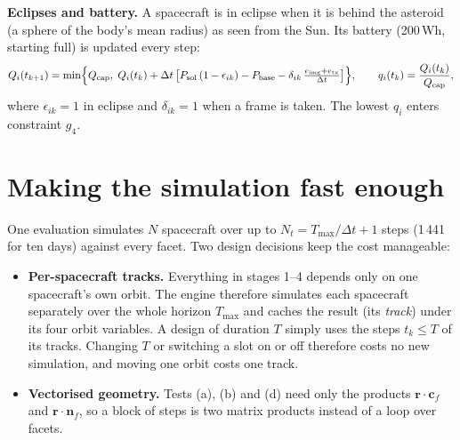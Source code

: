 \textbf{Eclipses and battery.} A spacecraft is in eclipse when it is behind the asteroid (a sphere
of the body's mean radius) as seen from the Sun. Its battery (200\,Wh, starting full) is updated
every step:
\begin{equation}
Q_i(t_{k+1})=\min\Bigl\{Q_{\mathrm{cap}},\;Q_i(t_k)+\Delta t\,\bigl[P_{\mathrm{sol}}\,(1-\epsilon_{ik})-P_{\mathrm{base}}
-\delta_{ik}\,\tfrac{e_{\mathrm{img}}+e_{\mathrm{tx}}}{\Delta t}\bigr]\Bigr\},\qquad q_i(t_k)=\frac{Q_i(t_k)}{Q_{\mathrm{cap}}},
\end{equation}
where $\epsilon_{ik}=1$ in eclipse and $\delta_{ik}=1$ when a frame is taken. The lowest $q_i$ enters
constraint $g_4$.

\section{Making the simulation fast enough}
One evaluation simulates $N$ spacecraft over up to $N_t=T_{\max}/\Delta t+1$ steps (1\,441 for
ten days) against every facet. Two design decisions keep the cost manageable:
\begin{itemize}
\item \textbf{Per-spacecraft tracks.} Everything in stages 1--4 depends only on one spacecraft's
own orbit. The engine therefore simulates each spacecraft separately over the whole horizon
$T_{\max}$ and caches the result (its \emph{track}) under its four orbit variables. A design of
duration $T$ simply uses the steps $t_k\le T$ of its tracks. Changing $T$ or switching a slot on
or off therefore costs no new simulation, and moving one orbit costs one track.
\item \textbf{Vectorised geometry.} Tests (a), (b) and (d) need only the products
$\mathbf{r}\cdot\mathbf{c}_f$ and $\mathbf{r}\cdot\mathbf{n}_f$, so a block of steps is two matrix
products instead of a loop over facets.
\end{itemize}
